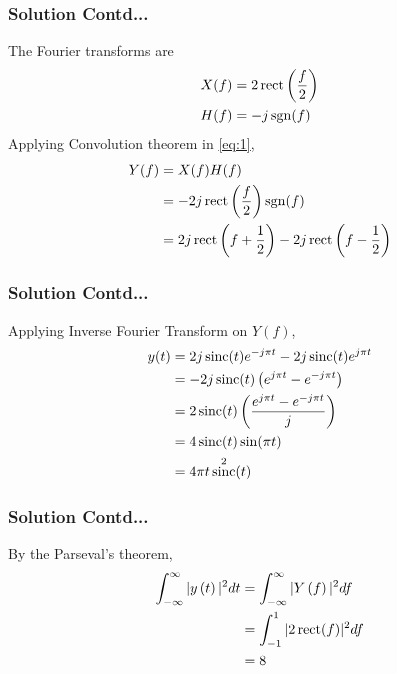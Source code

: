 \documentclass{beamer}
\newcommand{\sgn}{\mathop{\mathrm{sgn}}}
\DeclareMathOperator{\sinc}{sinc}
\DeclareMathOperator{\rect}{rect}
\begin{document}
\begin{frame}[fragile]
\frametitle{Solution Contd...}
\begin{flushleft}
The Fourier transforms are
\begin{align}
    X(f) &= 2\rect\brak{\frac{f}{2}}\\
    H(f) &= -j\sgn(f)
\end{align}
Applying Convolution theorem in \eqref{eq:1},
\begin{align}
    Y(f) &= X(f)H(f)\\
    &= -2j\rect\brak{\frac{f}{2}}\sgn(f)\\
    &= 2j\rect\brak{f + \frac{1}{2}} - 2j\rect\brak{f - \frac{1}{2}}
\end{align}
\end{flushleft}
\end{frame}
\begin{frame}[fragile]
\frametitle{Solution Contd...}
\begin{flushleft}
Applying Inverse Fourier Transform on $Y(f)$,
\begin{align}
    y(t) &= 2j\sinc(t)e^{-j\pi t} - 2j\sinc(t)e^{j\pi t}\\
    &= -2j\sinc(t)\brak{e^{j\pi t} - e^{-j\pi t}}\\
    &= 2\sinc(t)\brak{\frac{e^{j\pi t} - e^{-j\pi t}}{j}}\\
    &= 4\sinc(t)\sin(\pi t)\\
    &= 4\pi t\sinc^2(t)
\end{align}
\end{flushleft}
\end{frame}
\begin{frame}[fragile]
\frametitle{Solution Contd...}
\begin{flushleft}
By the Parseval's theorem,
\begin{align}
    \int_{-\infty}^{\infty} |y\brak{t}|^{2} dt &= \int_{-\infty}^{\infty} |Y\brak{f}|^{2} df\\
    &= \int_{-1}^{1} |2\rect(f)|^2df\\
    &= 8
\end{align}
\end{flushleft}
\end{frame}
\end{document}
